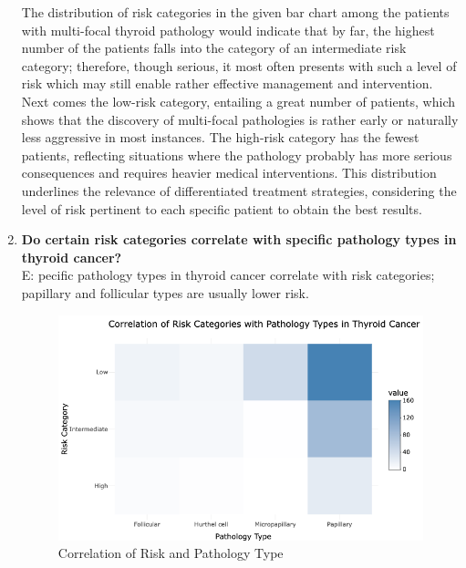 \documentclass[12pt]{article}
\begin{document}
\begin{enumerate}
The distribution of risk categories in the given bar chart among the patients with multi-focal thyroid pathology would indicate that by far, the highest number of the patients falls into the category of an intermediate risk category; therefore, though serious, it most often presents with such a level of risk which may still enable rather effective management and intervention. Next comes the low-risk category, entailing a great number of patients, which shows that the discovery of multi-focal pathologies is rather early or naturally less aggressive in most instances. The high-risk category has the fewest patients, reflecting situations where the pathology probably has more serious consequences and requires heavier medical interventions. This distribution underlines the relevance of differentiated treatment strategies, considering the level of risk pertinent to each specific patient to obtain the best results.

    \newpage

 \item \textbf{Do certain risk categories correlate with specific pathology types in thyroid cancer?} \\
    E: pecific pathology types in thyroid cancer correlate with risk categories; papillary and follicular types are usually lower risk.
    
    \begin{figure}[h]
        \vspace{5pt}
        \centering
        \includegraphics[width=1.1\textwidth]{risk vs path.png}  
        \caption{Correlation of Risk and Pathology Type}
            \label{fig:example}
       \vspace{0.5cm}
    \end{figure}


\end{enumerate}
\end{document}
